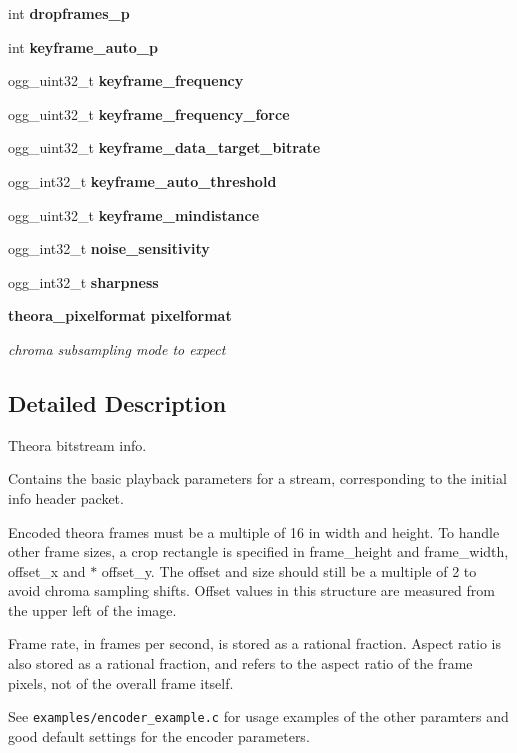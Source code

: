 \begin{DoxyCompactItemize}
\item 
int \textbf{ dropframes\+\_\+p}
\item 
int \textbf{ keyframe\+\_\+auto\+\_\+p}
\item 
ogg\+\_\+uint32\+\_\+t \textbf{ keyframe\+\_\+frequency}
\item 
ogg\+\_\+uint32\+\_\+t \textbf{ keyframe\+\_\+frequency\+\_\+force}
\item 
ogg\+\_\+uint32\+\_\+t \textbf{ keyframe\+\_\+data\+\_\+target\+\_\+bitrate}
\item 
ogg\+\_\+int32\+\_\+t \textbf{ keyframe\+\_\+auto\+\_\+threshold}
\item 
ogg\+\_\+uint32\+\_\+t \textbf{ keyframe\+\_\+mindistance}
\item 
ogg\+\_\+int32\+\_\+t \textbf{ noise\+\_\+sensitivity}
\item 
ogg\+\_\+int32\+\_\+t \textbf{ sharpness}
\item 
\textbf{ theora\+\_\+pixelformat} \textbf{ pixelformat}
\begin{DoxyCompactList}\small\item\em chroma subsampling mode to expect \end{DoxyCompactList}\end{DoxyCompactItemize}


\subsection{Detailed Description}
Theora bitstream info. 

Contains the basic playback parameters for a stream, corresponding to the initial \textquotesingle{}info\textquotesingle{} header packet.

Encoded theora frames must be a multiple of 16 in width and height. To handle other frame sizes, a crop rectangle is specified in frame\+\_\+height and frame\+\_\+width, offset\+\_\+x and $\ast$ offset\+\_\+y. The offset and size should still be a multiple of 2 to avoid chroma sampling shifts. Offset values in this structure are measured from the upper left of the image.

Frame rate, in frames per second, is stored as a rational fraction. Aspect ratio is also stored as a rational fraction, and refers to the aspect ratio of the frame pixels, not of the overall frame itself.

See {\tt examples/encoder\+\_\+example.\+c} for usage examples of the other paramters and good default settings for the encoder parameters. 

